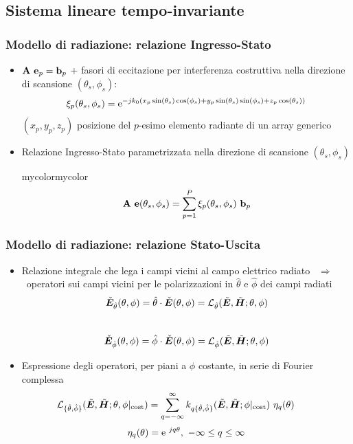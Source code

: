 \documentclass[11pt]{beamer}
\begin{document}
\subsection{Sistema lineare tempo-invariante}
\frame
{
\frametitle{Modello di radiazione: relazione Ingresso-Stato}
\begin{itemize}
\item $\mat{A} \ \vect{e}_p  = \vect{b}_p$ + \alert{fasori di eccitazione} per interferenza costruttiva nella direzione di scansione $(\theta_s,\phi_s)$: \vspace{-.2cm}
$$\xi_p(\theta_s,\phi_s) = \mathrm{e}^{-jk_0 ( x_p \sin(\theta_{s}) \cos(\phi_s) + y_p \sin(\theta_{s}) \sin(\phi_s) + z_p \cos(\theta_s) )}$$ %
\footnotesize $(x_p,y_p,z_p)$ posizione del $p$-esimo elemento radiante di un array generico \\ \pause %
\item \normalsize \alert{Relazione Ingresso-Stato parametrizzata nella direzione di scansione $(\theta_s,\phi_s)$} \\
\begin{colorblock}{mycolor}{mycolor}{}
$$\mat{A} \ \vect{e} (\theta_s,\phi_s)  = \sum_{p=1}^{P} \xi_p(\theta_s,\phi_s) \ \vect{b}_p $$ %
\end{colorblock}
\end{itemize}
}

\frame
{
\frametitle{Modello di radiazione: relazione Stato-Uscita}
\begin{itemize}
\item Relazione integrale che lega i campi vicini al campo elettrico radiato \ $\Rightarrow$ \ \alert{operatori sui campi vicini} per le polarizzazioni in ${\hat{\theta}}$ e ${\hat{\phi}}$ dei campi radiati \vspace{-.1cm} $$ \check{\mbfit E}_{\hat{\theta}} (\theta, \phi) = {\hat{\theta}} \cdot \check{\mbfit E} (\theta, \phi) = {\mathcal{L}}_{\hat{\theta}}(\tilde{\mbfit E}, \tilde{\mbfit H} ; \theta, \phi)$$ \\[-.6cm] $$ \check{\mbfit E}_{\hat{\phi}} (\theta, \phi) = {\hat{\phi}} \cdot \check{\mbfit E} (\theta, \phi) = {\mathcal{L}}_{\hat{\phi}}(\tilde{\mbfit E}, \tilde{\mbfit H} ; \theta, \phi)$$ \pause
\vspace{-.5cm}
\item Espressione degli operatori, per piani a $\phi$ costante, in \alert{serie di Fourier complessa} \\[-.6cm]
$$\hspace{-.8cm} \mathcal{L}_{\{ {\hat{\theta}},{\hat{\phi}} \}}(\tilde{\mbfit E}, \tilde{\mbfit H}; \theta, \phi |_\mrm{cost}) = \sum_{q=-\infty}^{\infty} k_{q \{ {\hat{\theta}},{\hat{\phi}} \}} (\tilde{\mbfit E}, \tilde{\mbfit H} ; \phi |_\mrm{cost}) \ \eta_q(\theta)$$
\vspace{-.2cm} $$\displaystyle \eta_q(\theta) = \mathrm{e}^{\ j q \theta}, \ -\infty \leq q \leq \infty$$
\end{itemize}
}
\end{document}
